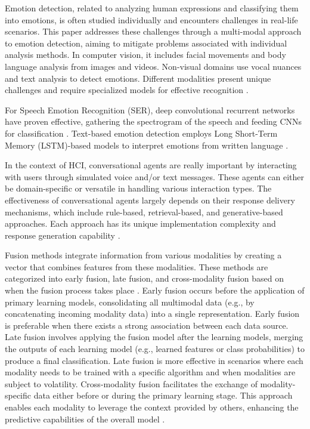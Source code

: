 \documentclass[runningheads]{llncs}
\begin{document}
Emotion detection, related to analyzing human expressions and classifying them into emotions, is often studied individually and encounters challenges in real-life scenarios. This paper addresses these challenges through a multi-modal approach to emotion detection, aiming to mitigate problems associated with individual analysis methods. In computer vision, it includes facial movements and body language analysis from images and videos. Non-visual domains use vocal nuances and text analysis to detect emotions. Different modalities present unique challenges and require specialized models for effective recognition \cite{Chul2018, Trigeorgis2016, Karna2020}.

For Speech Emotion Recognition (SER), deep convolutional recurrent networks have proven effective, gathering the spectrogram of the speech and feeding CNNs for classification \cite{Badshah2017}. Text-based emotion detection employs Long Short-Term Memory (LSTM)-based models to interpret emotions from written language \cite{Trigeorgis2016, Karna2020}.

In the context of HCI, conversational agents are really important by interacting with users through simulated voice and/or text messages. These agents can either be domain-specific or versatile in handling various interaction types. The effectiveness of conversational agents largely depends on their response delivery mechanisms, which include rule-based, retrieval-based, and generative-based approaches. Each approach has its unique implementation complexity and response generation capability \cite{aljaroodi_avatars_2019, fernandes_survey_2020, ramesh_survey_2017, mohamad_suhaili_service_2021}.

Fusion methods integrate information from various modalities by creating a vector that combines features from these modalities. These methods are categorized into early fusion, late fusion, and cross-modality fusion based on when the fusion process takes place \cite{sleeman_multimodal_2022, zhu_multimodal_2023}. Early fusion occurs before the application of primary learning models, consolidating all multimodal data (e.g., by concatenating incoming modality data) into a single representation. Early fusion is preferable when there exists a strong association between each data source. Late fusion involves applying the fusion model after the learning models, merging the outputs of each learning model (e.g., learned features or class probabilities) to produce a final classification. Late fusion is more effective in scenarios where each modality needs to be trained with a specific algorithm and when modalities are subject to volatility. Cross-modality fusion facilitates the exchange of modality-specific data either before or during the primary learning stage. This approach enables each modality to leverage the context provided by others, enhancing the predictive capabilities of the overall model \cite{sleeman_multimodal_2022}.
\end{document}
